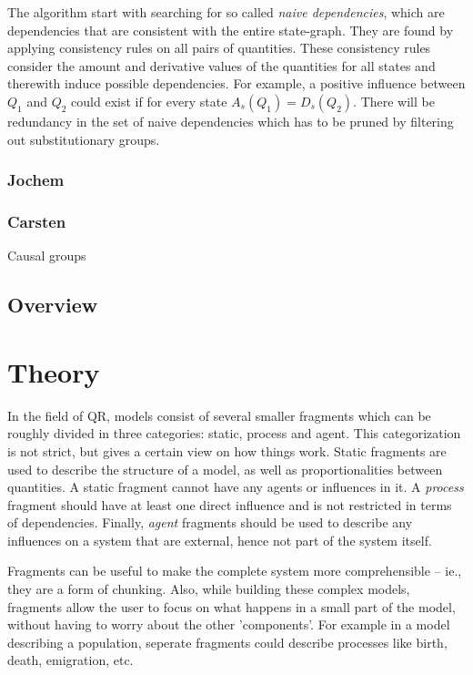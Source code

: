 \documentclass{article}
\begin{document}
The algorithm start with searching for so called \emph{naive dependencies},
which are dependencies that are consistent with the entire state-graph. They are
found by applying consistency rules on all pairs of quantities. These
consistency rules consider the amount and derivative values of the quantities
for all states and therewith induce possible dependencies. For example, a
 positive influence between $Q_1$ and $Q_2$ could exist if for every state 
 $A_s(Q_1) = D_s(Q_2)$.
There will be redundancy in the set of naive dependencies which has to be pruned
by filtering out substitutionary groups. %
 

\subsubsection{Jochem}

\subsubsection{Carsten}
Causal groups %

\subsection{Overview}

\section{Theory}

In the field of QR, models %
consist of
several smaller fragments which can be roughly divided in three categories:
static, process and agent. This categorization is not strict, but gives
a certain view on how things work. Static fragments are used to describe the
structure of a model, as well as proportionalities between quantities. A static
fragment cannot have any agents or influences in it. A \emph{process} fragment
should have at least one direct influence and is not restricted in terms of dependencies. %
Finally, \emph{agent} fragments should be used to describe any influences on a
system that are external, hence not part of the system itself.

Fragments can be useful to make the complete system more comprehensible -- ie., they are a form of chunking. 
Also, while building these complex models, fragments allow the user to focus on
what happens in a small part of the model, without having to worry about the
other 'components'. For example in a model describing a population, seperate
fragments could describe processes like birth, death, emigration, etc.
\end{document}
